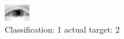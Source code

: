 \begin{figure}[h!]
\begin{center}
\includegraphics[width=0.60\columnwidth]{figures/ID2364_class_1_target_2.png}
\end{center}
\caption{ Classification: 1 actual target: 2}
\label{fig:ID2364_class_1_target_2}
\end{figure}
